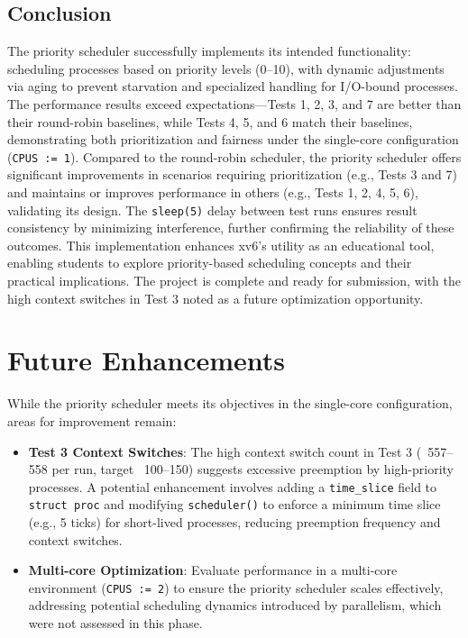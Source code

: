 \documentclass{article}
\begin{document}
\subsection{Conclusion}
The priority scheduler successfully implements its intended functionality: scheduling processes based on priority levels (0–10), with dynamic adjustments via aging to prevent starvation and specialized handling for I/O-bound processes. The performance results exceed expectations—Tests 1, 2, 3, and 7 are better than their round-robin baselines, while Tests 4, 5, and 6 match their baselines, demonstrating both prioritization and fairness under the single-core configuration (\texttt{CPUS := 1}). Compared to the round-robin scheduler, the priority scheduler offers significant improvements in scenarios requiring prioritization (e.g., Tests 3 and 7) and maintains or improves performance in others (e.g., Tests 1, 2, 4, 5, 6), validating its design. The \texttt{sleep(5)} delay between test runs ensures result consistency by minimizing interference, further confirming the reliability of these outcomes. This implementation enhances xv6’s utility as an educational tool, enabling students to explore priority-based scheduling concepts and their practical implications. The project is complete and ready for submission, with the high context switches in Test 3 noted as a future optimization opportunity.

\section{Future Enhancements}
While the priority scheduler meets its objectives in the single-core configuration, areas for improvement remain:
\begin{itemize}
    \item \textbf{Test 3 Context Switches}: The high context switch count in Test 3 (~557–558 per run, target ~100–150) suggests excessive preemption by high-priority processes. A potential enhancement involves adding a \texttt{time\_slice} field to \texttt{struct proc} and modifying \texttt{scheduler()} to enforce a minimum time slice (e.g., 5 ticks) for short-lived processes, reducing preemption frequency and context switches.
    \item \textbf{Multi-core Optimization}: Evaluate performance in a multi-core environment (\texttt{CPUS := 2}) to ensure the priority scheduler scales effectively, addressing potential scheduling dynamics introduced by parallelism, which were not assessed in this phase.
\end{itemize}
\end{document}
